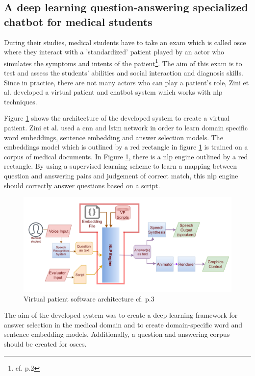 \subsection{A deep learning question-answering specialized chatbot for medical students}
During their studies, medical students have to take an exam which is called \ac{osce} where they interact with a 'standardized' patient played by an actor who simulates the symptoms and intents of the patient\footnote{cf.\autocite{zini} p.2}. The aim of this exam is to test and assess the students' abilities and social interaction and diagnosis skills.
Since in practice, there are not many actors who can play a patient's role, Zini et al. developed a virtual patient and chatbot system which works with \ac{nlp} techniques.

Figure \ref{vp_architecture} shows the architecture of the developed system to create a virtual patient. Zini et al. used a \ac{cnn} and \ac{lstm} network in order to learn domain specific word embeddings, sentence embedding and answer selection models.
The embeddings model which is outlined by a red rectangle in figure \ref{vp_architecture} is trained on a corpus of medical documents.
In Figure \ref{vp_architecture}, there is a \ac{nlp} engine outlined by a red rectangle. By using a supervised learning scheme to learn a mapping between question and answering pairs and judgement of correct match, this \ac{nlp} engine should correctly answer questions based on a script.

\begin{figure}[h!]
	\centering
	\includegraphics[width=1\textwidth]{images/vp_architecture.png}
	\caption{Virtual patient software architecture cf.\autocite{zini} p.3}
	\label{vp_architecture}
\end{figure}

The aim of the developed system was to create a deep learning framework for answer selection in the medical domain and to create domain-specific word and sentence embedding models. Additionally, a question and answering corpus should be created for \ac{osce}s.

